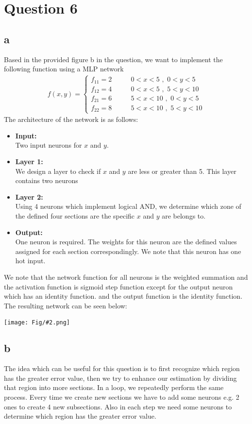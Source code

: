 \documentclass[]{article}
\newcommand{\pict}[2]{\begin{center}
		\texttt{[image: Fig/\#2.png]}
\end{center}}
\begin{document}
	\section{Question 6}
	\subsection*{a}
	Based in the provided figure b in the question, we want to implement the following function using a MLP network
	\begin{align*}
		f(x,y) = \begin{cases}
			f_{11} = 2 \qquad & 0<x<5 \,\, , \,\, 0<y<5\\
			f_{12} = 4  & 0<x<5 \,\, , \,\, 5<y<10\\
			f_{21} = 6 & 5<x<10 \,\, , \,\, 0<y<5\\
			f_{22} = 8  & 5<x<10 \,\, , \,\, 5<y<10
		\end{cases}
	\end{align*}
	The architecture of the network is as follows:
	\begin{itemize}
		\item \textbf{Input:}\\
		Two input neurons for $x$ and $y$.
		\item \textbf{Layer 1:}\\
		We design a layer to check if $x$ and $y$ are less or greater than 5. This layer contains two neurons
		\item \textbf{Layer 2:}\\
		Using 4 neurons which implement logical AND, we determine which zone of the defined four sections are the specific $x$ and $y$ are belongs to.
		\item \textbf{Output:}\\
		One neuron is required. The weights for this neuron are the defined values assigned for each section correspondingly. We note that this neuron has one hot input.
	\end{itemize}
	We note that the network function for all neurons is the weighted summation and the activation function is sigmoid step function except for the output neuron which has an identity function. and the output function is the identity function. The resulting network can be seen below:
	\pict{0.5}{F12}
	
	\subsection*{b}
	The idea which can be useful for this question is to first recognize which region has the greater error value, then we try to enhance our estimation by dividing that region into more sections. In a loop, we repeatedly perform the same process. Every time we create new sections we have to add some neurons e.g. 2 ones to create 4 new subsections. Also in each step we need some neurons to determine which region has the greater error value.
	
\end{document}
